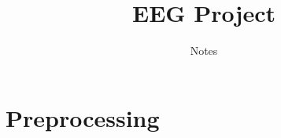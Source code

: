 \documentclass[12pt,pdftex,a4paper]{scrbook}
\renewcommand{\_}{\underscore\-}
\begin{document}
	\thispagestyle{empty}
	\title{EEG Project}
	\subtitle{Notes}
	\maketitle
	
	\chapter{Preprocessing}
	
	
\end{document}
